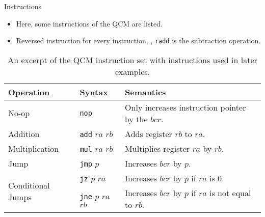 \begin{frame}{Instructions}
    \begin{itemize}
        \item Here, some instructions of the QCM are listed.
        \item Reversed instruction for every instruction, \eg, \texttt{radd} is the subtraction operation.
    \end{itemize}
    \begin{table}[htp]
        \centering
        \begin{tabular}{llp{}}
            \multicolumn{1}{l|}{Operation}                          & \multicolumn{1}{l|}{Syntax}                                      & Semantics                                                              \\ \hline
            
            \multicolumn{1}{l|}{No-op}                              & \multicolumn{1}{l|}{\texttt{nop}}               & Only increases instruction pointer by the $bcr$.     \\ \hline
            
            \multicolumn{1}{l|}{Addition}                           & \multicolumn{1}{l|}{\texttt{add} $ra$ $rb$}     & Adds register $rb$ to $ra$.                                            \\
            \multicolumn{1}{l|}{Multiplication}                     & \multicolumn{1}{l|}{\texttt{mul} $ra$ $rb$}     & Multiplies register $ra$ by $rb$.                                      \\ \hline
            
            \multicolumn{1}{l|}{Jump}                               & \multicolumn{1}{l|}{\texttt{jmp} $p$}           & Increases $bcr$ by $p$.                              \\ \hline
            \multicolumn{1}{l|}{\multirow{2}{*}{Conditional Jumps}} & \multicolumn{1}{l|}{\texttt{jz} $p$ $ra$}       & Increases $bcr$ by $p$ if $ra$ is $0$.               \\
            \multicolumn{1}{l|}{}                                   & \multicolumn{1}{l|}{\texttt{jne} $p$ $ra$ $rb$} & Increases $bcr$ by $p$ if $ra$ is not equal to $rb$. 
        \end{tabular}
        \caption{An excerpt of the QCM instruction set with instructions used in later examples.}
    \end{table}
\end{frame}

